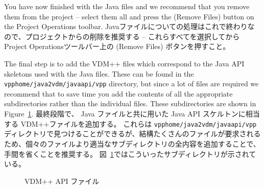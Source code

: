 \documentclass[\pformat,12pt]{jarticle}
\newcommand{\vdmhome}{vpphome}
\newcommand{\guicmd}[1]{{\sf #1}}
\begin{document}
You have now finished with the Java files and we recommend that you
remove them from the project -- select them all and press the 
(\guicmd{Remove Files}) button on the \guicmd{Project Operations}
toolbar.
 Javaファイルについての処理はこれで終わりなので、プロジェクトからの削除を推奨する -- これらすべてを選択してから \guicmd{Project Operations}ツールバー上の (\guicmd{Remove Files}) ボタンを押すこと。

The final step is to add the VDM++ files which correspond to the Java
API skeletons used with the Java files. These can be found in the {\tt
  \vdmhome/java2vdm/javaapi/vpp} directory, but since a lot of files are
required we recommend that to save time you add the contents of all
the appropriate subdirectories rather than the individual files. These
subdirectories are shown in Figure~\ref{fig:vdmApiFiles}. 
最終段階で、 Java ファイルと共に用いた Java API スケルトンに相当する VDM++ファイルを追加する。 
これらは {\tt \vdmhome/java2vdm/javaapi/vpp} ディレクトリで見つけることができるが、結構たくさんのファイルが要求されるため、個々のファイルより適当なサブディレクトリの全内容を追加することで、手間を省くことを推奨する。
 図~\ref{fig:vdmApiFiles}ではこういったサブディレクトリが示されている。

\begin{figure}[tbh]
\begin{center}
\caption{VDM++ API ファイル}\label{fig:vdmApiFiles}
\end{center}
\end{figure}
\end{document}
